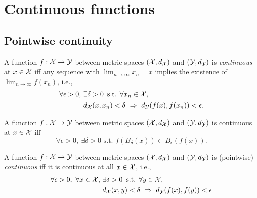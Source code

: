 \section{Continuous functions}
\label{sec:continuous-functions-metricSpaces}

\subsection{Pointwise continuity}
\label{sec:pointwise-continuity}

\begin{defn}
  \label{def:continuousFuncPointMetricSpace}
  A function $f: {\cal X} \rightarrow {\cal Y}$
  between metric spaces $({\cal X},d_{\cal X})$
  and $({\cal Y}, d_{\cal Y})$
  is \emph{continuous} at $x\in{\cal X}$ iff 
  any sequence with $\lim_{n\rightarrow \infty}x_n = x$
  implies the existence of $\lim_{n\rightarrow \infty}f(x_n)$, 
  i.e., 
  \begin{align}
    \label{eq:continuousFuncPointMetricSpace}
    \forall \epsilon>0,\ &\exists \delta>0\, \text{ s.t. }
    \forall x_n \in {\cal X}, \ \
    \\ \nonumber
                         &d_{\cal X}(x,x_n)<\delta\ \Rightarrow\
                           d_{\cal Y}(f(x),f(x_n))<\epsilon. 
  \end{align}
\end{defn}


\begin{lem}
  \label{lem:pointContinuityBall}
  A function $f: {\cal X} \rightarrow {\cal Y}$
  between metric spaces $({\cal X},d_{\cal X})$
  and $({\cal Y}, d_{\cal Y})$
  is continuous at $x\in{\cal X}$ iff 
  \begin{equation}
    \label{eq:pointContinuityBall}
    \forall \epsilon > 0, \ \exists \delta>0 \text{ s.t. }
    f(B_{\delta}(x)) \subset B_{\epsilon}(f(x)).
  \end{equation}
\end{lem}

\begin{defn}
  \label{def:continuousFuncMetricSpace}
  A function $f: {\cal X} \rightarrow {\cal Y}$
  between metric spaces $({\cal X},d_{\cal X})$
  and $({\cal Y}, d_{\cal Y})$
  is (pointwise) \emph{continuous}
  iff it is continuous at all $x\in{\cal X}$,
  i.e., 
  \begin{align}
    \label{eq:continuousFuncMetricSpace}
    \forall \epsilon>0,\ \forall x\in {\cal X},\ 
    & \exists \delta>0\, \text{ s.t. }
    \forall y \in {\cal X},\ \
    \\ \nonumber
    &d_{\cal X}(x,y)<\delta\ \Rightarrow\ d_{\cal Y}(f(x),f(y))<\epsilon
  \end{align}
\end{defn}


